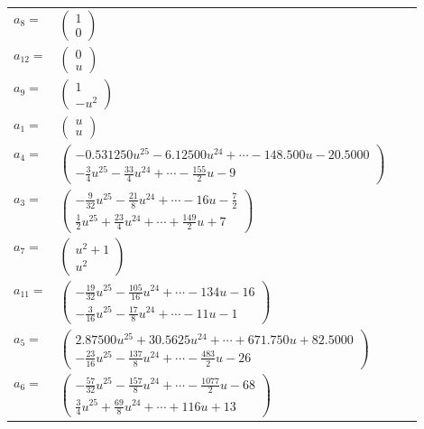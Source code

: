 \documentclass[1p]{elsarticle_modified}
\theoremstyle{definition}
\begin{document}
\begin{tabular}{m{7pt} m{180pt} m{7pt} m{180pt} }
\flushright $a_{8}=$&$\begin{pmatrix}1\\0\end{pmatrix}$ \\
\flushright $a_{12}=$&$\begin{pmatrix}0\\u\end{pmatrix}$ \\
\flushright $a_{9}=$&$\begin{pmatrix}1\\- u^2\end{pmatrix}$ \\
\flushright $a_{1}=$&$\begin{pmatrix}u\\u\end{pmatrix}$ \\
\flushright $a_{4}=$&$\begin{pmatrix}-0.531250 u^{25}-6.12500 u^{24}+\cdots-148.500 u-20.5000\\-\frac{3}{4} u^{25}-\frac{33}{4} u^{24}+\cdots-\frac{155}{2} u-9\end{pmatrix}$ \\
\flushright $a_{3}=$&$\begin{pmatrix}-\frac{9}{32} u^{25}-\frac{21}{8} u^{24}+\cdots-16 u-\frac{7}{2}\\\frac{1}{2} u^{25}+\frac{23}{4} u^{24}+\cdots+\frac{149}{2} u+7\end{pmatrix}$ \\
\flushright $a_{7}=$&$\begin{pmatrix}u^2+1\\u^2\end{pmatrix}$ \\
\flushright $a_{11}=$&$\begin{pmatrix}-\frac{19}{32} u^{25}-\frac{105}{16} u^{24}+\cdots-134 u-16\\-\frac{3}{16} u^{25}-\frac{17}{8} u^{24}+\cdots-11 u-1\end{pmatrix}$ \\
\flushright $a_{5}=$&$\begin{pmatrix}2.87500 u^{25}+30.5625 u^{24}+\cdots+671.750 u+82.5000\\-\frac{23}{16} u^{25}-\frac{137}{8} u^{24}+\cdots-\frac{483}{2} u-26\end{pmatrix}$ \\
\flushright $a_{6}=$&$\begin{pmatrix}-\frac{57}{32} u^{25}-\frac{157}{8} u^{24}+\cdots-\frac{1077}{2} u-68\\\frac{3}{4} u^{25}+\frac{69}{8} u^{24}+\cdots+116 u+13\end{pmatrix}$ \\

\end{tabular}
\end{document}
